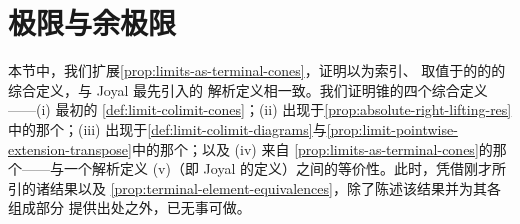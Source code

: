 
\providecommand{\Hom}{\operatorname{Hom}}
\providecommand{\rvTranspose}[1]{\ulcorner #1\urcorner}%

\section{极限与余极限}\label{sec:f-limits-and-colimits}

本节中，我们扩展\cref{prop:limits-as-terminal-cones}，证明以\trSimplicialSet{}为索引、
取值于\trQuasiCategory{}的\trDiagram{}的\trLimit{}的综合定义，与 Joyal \cite[4.5]{bib61} 最先引入的
解析定义相一致。我们证明\trLimit{}锥的四个综合定义——(i) 最初的%
\cref{def:limit-colimit-cones}；(ii) 出现于\cref{prop:absolute-right-lifting-res}中的那个；(iii) 出现于\cref{def:limit-colimit-diagrams}与\cref{prop:limit-pointwise-extension-transpose}中的那个；以及 (iv) 来自%
\cref{prop:limits-as-terminal-cones}的那个——与一个解析定义 (v)（即 Joyal
的定义）之间的等价性。此时，凭借刚才所引的诸结果以及%
\cref{prop:terminal-element-equivalences}，除了陈述该结果并为其各组成部分
提供出处之外，已无事可做。

